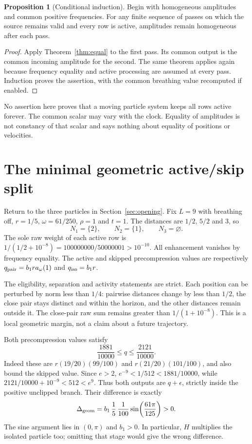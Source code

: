 \documentclass[11pt,a4paper]{article}
\theoremstyle{definition}
\newtheorem{proposition}[theorem]{Proposition}
\theoremstyle{remark}\newtheorem{remark}[theorem]{Remark}
\numberwithin{equation}{section}
\begin{document}
\begin{proposition}[Conditional induction]\label{prop:induction}
Begin with homogeneous amplitudes and common positive frequencies.
For any finite sequence of passes on which the source remains valid and every row
is active, amplitudes remain homogeneous after each pass.
\end{proposition}
\begin{proof}
Apply Theorem~\ref{thm:equal} to the first pass. Its common output is the common
incoming amplitude for the second. The same theorem applies again because
frequency equality and active processing are assumed at every pass. Induction
proves the assertion, with the common breathing value recomputed if enabled.
\end{proof}
No assertion here proves that a moving particle system keeps all rows active forever.
The common scalar may vary with the clock. Equality of amplitudes is not constancy
of that scalar and says nothing about equality of positions or velocities.

\section{The minimal geometric active/skip split}\label{sec:geometric}
Return to the three particles in Section~\ref{sec:opening}. Fix $L=9$ with breathing
off, $r=1/5$, $\omega=61/250$, $\rho=1$ and $t=1$.
The distances are $1/2$, $5/2$ and $3$, so
\begin{equation}\label{eq:threegraph}
 N_1=\{2\},\qquad N_2=\{1\},\qquad N_3=\varnothing.
\end{equation}
The sole raw weight of each active row is
$1/(1/2+10^{-8})=100000000/50000001>10^{-10}$.
All enhancement vanishes by frequency equality. The active and skipped
precompression values are respectively
$q_{\rm pair}=b_1r a_\omega(1)$ and $q_{\rm iso}=b_1r$.

The eligibility, separation and activity statements are strict. Each position
can be perturbed by norm less than $1/4$: pairwise distances change by less
than $1/2$, the close pair stays distinct and within the horizon, and the other
distances remain outside it. The close-pair raw sum remains greater than
$1/(1+10^{-8})$. This is a local geometric margin, not a claim about a future trajectory.

Both precompression values satisfy
\begin{equation}\label{eq:threebounds}
 \frac{1881}{10000}\leq q\leq\frac{2121}{10000}.
\end{equation}
Indeed these are $r(19/20)(99/100)$ and $r(21/20)(101/100)$,
and also bound the skipped value. Since $e>2$,
$e^{-9}<1/512<1881/10000$, while
$2121/10000+10^{-9}<512<e^9$.
Thus both outputs are $q+\epsilon$, strictly inside the positive unclipped branch.
Their difference is exactly
\begin{equation}\label{eq:threegap}
 \Delta_{\rm geom}=b_1\,\frac15\,\frac1{100}
                   \sin\!\left(\frac{61\pi}{125}\right)>0.
\end{equation}
The sine argument lies in $(0,\pi)$ and $b_1>0$. In particular, $H$ multiplies
the isolated particle too; omitting that stage would give the wrong difference.
\end{document}
